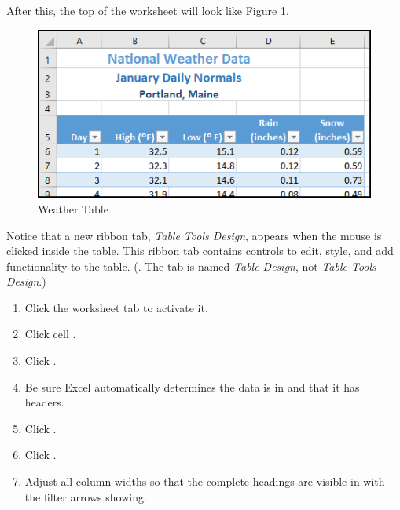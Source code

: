 After this, the top of the worksheet will look like Figure \ref{05:fig03}.

\begin{figure}[H]
	\centering
	\includegraphics[width=\maxwidth{.95\linewidth}]{gfx/ch05_fig03}
	\caption{Weather Table}
	\label{05:fig03}
\end{figure}

Notice that a new ribbon tab, \textit{Table Tools Design}, appears when the mouse is clicked inside the table. This ribbon tab contains controls to edit, style, and add functionality to the table. (. The tab is named \textit{Table Design}, not \textit{Table Tools Design}.)

\begin{enumerate}
	\item Click the  worksheet tab to activate it.
	\item Click cell .
	\item Click .
	\item Be sure Excel automatically determines the data is in  and that it has headers.
	\item Click .
	\item Click .
	\item Adjust all column widths so that the complete headings are visible in  with the filter arrows showing. 
\end{enumerate}

